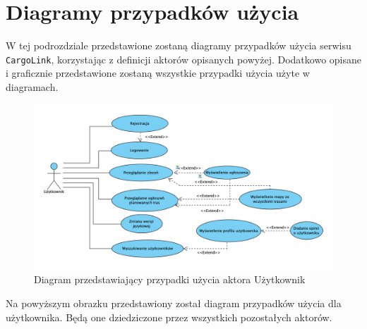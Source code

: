 \section{Diagramy przypadków użycia}
W tej podrozdziale przedstawione zostaną diagramy przypadków użycia serwisu \texttt{CargoLink}, korzystając z definicji aktorów opisanych powyżej. Dodatkowo opisane i graficznie przedstawione zostaną wszystkie przypadki użycia użyte w diagramach.
\begin{figure}[H]
	\centering
		\includegraphics[width=\linewidth]{rozdzial1/PU_uzytkownik.png}
	\caption{Diagram przedstawiający przypadki użycia aktora Użytkownik}
	\label{Rys. fig:Diagram przedstawiający przypadki użycia aktora Użytkownik}
\end{figure}
Na powyższym obrazku przedstawiony został diagram przypadków użycia dla użytkownika. Będą one dziedziczone przez wszystkich pozostałych aktorów. \\

